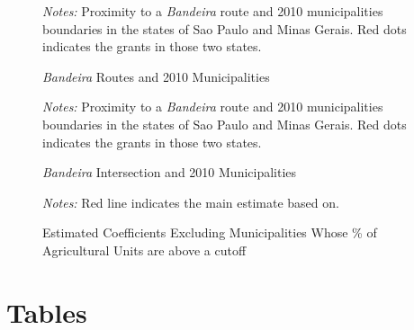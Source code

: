 \documentclass{article}
\begin{document}
\begin{figure}[h!]
  \caption{\textit{Bandeira} Routes and 2010 Municipalities \label{fig:bandeira_dist_graph}}
  \begin{center}
  \end{center}
  \textit{Notes:} Proximity to a \textit{Bandeira} route and 2010 municipalities boundaries in the states of Sao Paulo and Minas Gerais. Red dots indicates the grants in those two states.
  \label{fig:bandeira_dist_graph}
\end{figure}

\begin{figure}[h!]
  \caption{\textit{Bandeira} Intersection and 2010 Municipalities}
  \begin{center}
  \end{center}
  \textit{Notes:} Proximity to a \textit{Bandeira} route and 2010 municipalities boundaries in the states of Sao Paulo and Minas Gerais. Red dots indicates the grants in those two states.
  \label{fig:bandeiras_SE_treat}
\end{figure}

\begin{figure}[h!]
  \caption{Estimated Coefficients Excluding Municipalities Whose \% of Agricultural Units are above a cutoff}
  \begin{center}
  \end{center}
  \textit{Notes:} Red line indicates the main estimate based on.
  \label{fig:robustness_cutoffs}
\end{figure}

\clearpage

\section{Tables}


\end{document}
